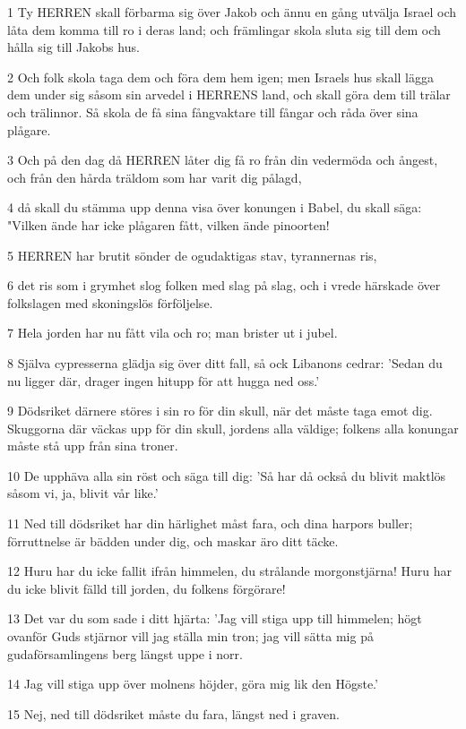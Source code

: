 \par 1 Ty HERREN skall förbarma sig över Jakob och ännu en gång utvälja Israel och låta dem komma till ro i deras land; och främlingar skola sluta sig till dem och hålla sig till Jakobs hus.
\par 2 Och folk skola taga dem och föra dem hem igen; men Israels hus skall lägga dem under sig såsom sin arvedel i HERRENS land, och skall göra dem till trälar och trälinnor. Så skola de få sina fångvaktare till fångar och råda över sina plågare.
\par 3 Och på den dag då HERREN låter dig få ro från din vedermöda och ångest, och från den hårda träldom som har varit dig pålagd,
\par 4 då skall du stämma upp denna visa över konungen i Babel, du skall säga: "Vilken ände har icke plågaren fått, vilken ände pinoorten!
\par 5 HERREN har brutit sönder de ogudaktigas stav, tyrannernas ris,
\par 6 det ris som i grymhet slog folken med slag på slag, och i vrede härskade över folkslagen med skoningslös förföljelse.
\par 7 Hela jorden har nu fått vila och ro; man brister ut i jubel.
\par 8 Själva cypresserna glädja sig över ditt fall, så ock Libanons cedrar: 'Sedan du nu ligger där, drager ingen hitupp för att hugga ned oss.'
\par 9 Dödsriket därnere störes i sin ro för din skull, när det måste taga emot dig. Skuggorna där väckas upp för din skull, jordens alla väldige; folkens alla konungar måste stå upp från sina troner.
\par 10 De upphäva alla sin röst och säga till dig: 'Så har då också du blivit maktlös såsom vi, ja, blivit vår like.'
\par 11 Ned till dödsriket har din härlighet måst fara, och dina harpors buller; förruttnelse är bädden under dig, och maskar äro ditt täcke.
\par 12 Huru har du icke fallit ifrån himmelen, du strålande morgonstjärna! Huru har du icke blivit fälld till jorden, du folkens förgörare!
\par 13 Det var du som sade i ditt hjärta: 'Jag vill stiga upp till himmelen; högt ovanför Guds stjärnor vill jag ställa min tron; jag vill sätta mig på gudaförsamlingens berg längst uppe i norr.
\par 14 Jag vill stiga upp över molnens höjder, göra mig lik den Högste.'
\par 15 Nej, ned till dödsriket måste du fara, längst ned i graven.
